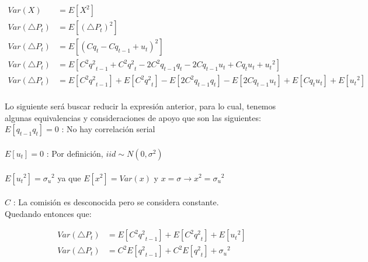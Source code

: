 \documentclass[a4paper]{article}
\begin{document}
\begin{equation}
\begin{aligned}
	Var(X) &=  E \left[ {X}^{2} \right] \\
    Var(\triangle{P}_{t}) &= E \left[ { (\triangle{P}_{t}) }^{2} \right] \\
    Var(\triangle{P}_{t}) &= E \left[ { ( C{q}_{t} - C{q}_{t-1} + {u}_{t} ) }^{2} \right] \\
    Var(\triangle{P}_{t}) &= E \left[ {C}^{2}{{q}^{2}}_{t-1} + {C}^{2}{{q}^{2}}_{t} -
    2{C}^{2}{q}_{t-1}{q}_{t} - 2{C}{q}_{t-1}{u}_{t} + {C}{q}_{t}{u}_{t} + {{u}_{t}}^{2} \right]  \\
    Var(\triangle{P}_{t}) &=  E \left[ {C}^{2}{{q}^{2}}_{t-1} \right] + 
		E \left[ {C}^{2}{{q}^{2}}_{t} \right] - E \left[ 2{C}^{2}{q}_{t-1}{q}_{t} \right] - 
        E \left[ 2{C}{q}_{t-1}{u}_{t} \right] + E \left[ {C}{q}_{t}{u}_{t}  \right] + 
        E \left[ {{u}_{t}}^{2} \right]  \\
\end{aligned}
\end{equation}

\newpage

Lo siguiente ser\'a buscar reducir la expresi\'on anterior, para lo cual, tenemos algunas equivalencias y consideraciones de apoyo que son las siguientes: \\

$E \left[ {q}_{t-1}{q}_{t} \right] = 0$ : No hay correlaci\'on serial \\\\
$E \left[ {u}_{t} \right] = 0$ : Por definici\'on, $iid \sim N(0,{\sigma}^{2})$ \\\\
$E \left[ {{u}_{t}}^{2} \right] = {{\sigma}_{u}}^{2}$ ya que $E \left[ {x}^{2} \right] = Var(x)$ y $x=\sigma \rightarrow {x}^{2} =  {{\sigma}_{u}}^{2}$ \\\\
$C$ : La comisi\'on es desconocida pero se considera constante. \\

Quedando entonces que:

\begin{equation}
\begin{aligned}
	Var(\triangle{P}_{t}) &= E \left[ {C}^{2}{{q}^{2}}_{t-1} \right] + E \left[ {C}^{2}{{q}^{2}}_{t} \right] +
    E \left[ {{u}_{t}}^{2} \right] \\
    Var(\triangle{P}_{t}) &= {C}^{2} E \left[ {{q}^{2}}_{t-1} \right] + {C}^{2} E\left[ {{q}^{2}}_{t} \right] +
    {{\sigma}_{u}}^{2}
\end{aligned}
\end{equation}
\\
\end{document}
